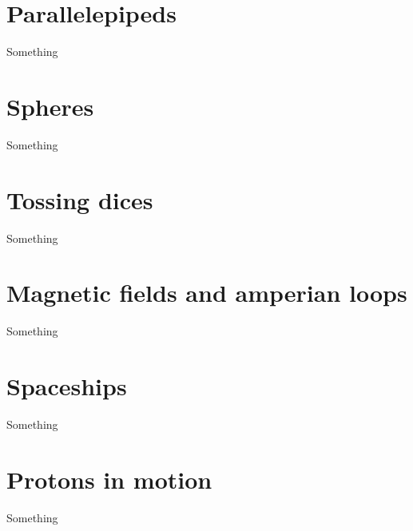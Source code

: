 \section{Parallelepipeds}
\label{sec:paralpyd}
Something

\section{Spheres}
\label{sec:speheres}
Something

\section{Tossing dices}
\label{sec:dices}
Something

\section{Magnetic fields and amperian loops}
\label{sec:magnamp}
Something

\section{Spaceships}
\label{sec:spaceship}
Something

\section{Protons in motion}
\label{sec:protons}
Something
